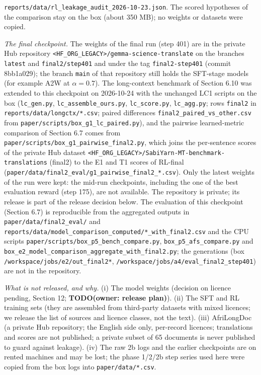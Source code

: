 \texttt{reports/data/rl\_leakage\_audit\_2026-10-23.json}. The scored hypotheses of the comparison stay on the box (about 350 MB); no weights or datasets were copied.

\emph{The final checkpoint.} The weights of the final run (step 401) are in the private Hub repository \texttt{<HF_ORG_LEGACY>/gemma-science-translate} on the branches \texttt{latest} and \texttt{final2/step401} and under the tag \texttt{final2-step401} (commit 8bb1a029); the branch \texttt{main} of that repository still holds the SFT-stage models (for example A2W at \(\alpha=0.7\)). The long-context benchmark of Section 6.10 was extended to this checkpoint on 2026-10-24 with the unchanged LC1 scripts on the box (\texttt{lc\_gen.py}, \texttt{lc\_assemble\_ours.py}, \texttt{lc\_score.py}, \texttt{lc\_agg.py}; rows \texttt{final2} in \texttt{reports/data/longctx/*.csv}; paired differences \texttt{final2\_paired\_vs\_other.csv} from \texttt{paper/scripts/box\_g1\_lc\_paired.py}), and the pairwise learned-metric comparison of Section 6.7 comes from \texttt{paper/scripts/box\_g1\_pairwise\_final2.py}, which joins the per-sentence scores of the private Hub dataset \texttt{<HF_ORG_LEGACY>/SabiYarn-MT-benchmark-translations} (final2) to the E1 and T1 scores of RL-final (\texttt{paper/data/final2\_eval/g1\_pairwise\_final2\_*.csv}). Only the latest weights of the run were kept: the mid-run checkpoints, including the one of the best evaluation reward (step 175), are not available. The repository is private; its release is part of the release decision below. The evaluation of this checkpoint (Section 6.7) is reproducible from the aggregated outputs in \texttt{paper/data/final2\_eval/} and \texttt{reports/data/model\_comparison\_computed/*\_with\_final2.csv} and the CPU scripts \texttt{paper/scripts/box\_p5\_bench\_compare.py}, \texttt{box\_p5\_afs\_compare.py} and \texttt{box\_e2\_model\_comparison\_aggregate\_with\_final2.py}; the generations (box \texttt{/workspace/jobs/e2/out\_final2*}, \texttt{/workspace/jobs/a4/eval\_final2\_step401}) are not in the repository.

\emph{What is not released, and why.} (i) The model weights (decision on licence pending, Section 12; {\color{red}\textbf{TODO(owner: release plan)}}). (ii) The SFT and RL training sets (they are assembled from third-party datasets with mixed licences; we release the list of sources and licence classes, not the text). (iii) AfriLongDoc (a private Hub repository; the English side only, per-record licences; translations and scores are not published; a private subset of 65 documents is never published to guard against leakage). (iv) The raw 2b logs and the earlier checkpoints are on rented machines and may be lost; the phase 1/2/2b step series used here were copied from the box logs into \texttt{paper/data/*.csv}.

